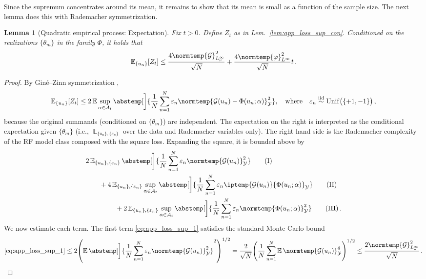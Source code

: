\documentclass{article}
\theoremstyle{plain}
\newtheorem{lemma}[theorem]{Lemma}
\theoremstyle{my_def}
\theoremstyle{my_rem}
\numberwithin{equation}{section}
\numberwithin{theorem}{section}%
\newcommand{\E}{\mathbb{E}}
\newcommand{\cA}{\mathcal{A}}
\newcommand{\cG}{\mathcal{G}}
\newcommand{\cY}{\mathcal{Y}}
\let\originalleft\left %
\let\originalright\right
\renewcommand{\left}{\mathopen{}\mathclose\bgroup\originalleft}
\renewcommand{\right}{\aftergroup\egroup\originalright}
\newcommand{\ip}{\iptemp}
\newcommand{\norm}{\normtemp}
\newcommand{\abs}{\abstemp}
\renewcommand{\E}{\operatorname{\mathbb{E}}} %
\newcommand{\diid}{\stackrel{\mathrm{iid}}{\sim}} %
\newcommand{\unif}{\mathrm{Unif}}
\newcommand{\Unif}{\unif}
\newcommand{\al}{\alpha}
\def\qw{\quad\text{where}\quad}
\newcommand{\U}{{\{u_n\}}}
\newcommand{\Th}{{\{\theta_m\}}}
\newcommand{\eps}{\varepsilon}
\renewcommand{\phi}{\varphi}
\begin{document}
Since the supremum concentrates around its mean, it remains to show that its mean is small as a function of the sample size. The next lemma does this with Rademacher symmetrization.
\begin{lemma}[Quadratic empirical process: Expectation]\label{lem:app_loss_sup_expect}
    Fix $t>0$. Define $Z_t$ as in Lem.~\ref{lem:app_loss_sup_con}. Conditioned on the realizations $\Th$ in the family $\Phi$, it holds that
    \begin{equation}
        \E_{\U} [Z_t] \leq \frac{4\norm{\cG}_{L_\nu^\infty}^2}{\sqrt{N}}
        + \frac{4\norm{\phi}_{L^\infty}^2}{\sqrt{N}}t\,.
    \end{equation}
\end{lemma}
\begin{proof}
    By Gin\'e--Zinn symmetrization \cite[see, e.g.,][Sect. 4.2, Prop. 4.11, pp. 107--108]{wainwright2019high},
    \begin{equation*}
            \E_{\U} [Z_t] \leq 2\E\sup_{\al\in\cA_t}\abs[\bigg]{\frac{1}{N}\sum_{n=1}^N\eps_n\norm{\cG(u_n)-\Phi(u_n;\al)}_{\cY}^2},\qw \eps_n\diid \Unif\bigl(\{+1,-1\}\bigr)\,,
    \end{equation*}
    because the original summands (conditioned on $\Th$) are independent. The expectation on the right is interpreted as the conditional expectation given $\Th$ (i.e., $\E_{\U,\{\eps_n\}}$ over the data and Rademacher variables only). The right hand side is the Rademacher complexity of the RF model class composed with the square loss. Expanding the square, it is bounded above by
    \begin{align}
        &2\E_{\U,\{\eps_n\}}\abs[\bigg]{\frac{1}{N}\sum_{n=1}^N\eps_n\norm{\cG(u_n)}_{\cY}^2}\tag{I}\label{eq:app_loss_sup_1}\\
        &\qquad+4\E_{\U,\{\eps_n\}}\sup_{\al\in\cA_t}\abs[\bigg]{\frac{1}{N}\sum_{n=1}^N\eps_n\ip{\cG(u_n)}{\Phi(u_n;\al)}_{\cY}}\tag{II}\label{eq:app_loss_sup_2}\\
        &\qquad\qquad \ + 2\E_{\U,\{\eps_n\}}\sup_{\al\in\cA_t}\abs[\bigg]{\frac{1}{N}\sum_{n=1}^N\eps_n\norm{\Phi(u_n;\al)}_{\cY}^2}\tag{III}\label{eq:app_loss_sup_3}\,.
    \end{align}
    We now estimate each term. The first term \eqref{eq:app_loss_sup_1} satisfies the standard Monte Carlo bound
    \begin{equation*}
            \eqref{eq:app_loss_sup_1}\leq 2\left(\E\abs[\bigg]{\frac{1}{N}\sum_{n=1}^N\eps_n\norm{\cG(u_n)}_{\cY}^2}^2\right)^{1/2}=
    \frac{2}{\sqrt{N}}\left(\frac{1}{N}\sum_{n=1}^N\E\norm{\cG(u_n)}_{\cY}^4\right)^{1/2}\leq \frac{2\norm{\cG}_{L^\infty_\nu}^2}{\sqrt{N}}\,.

\end{equation*}
\end{proof}
\end{document}
